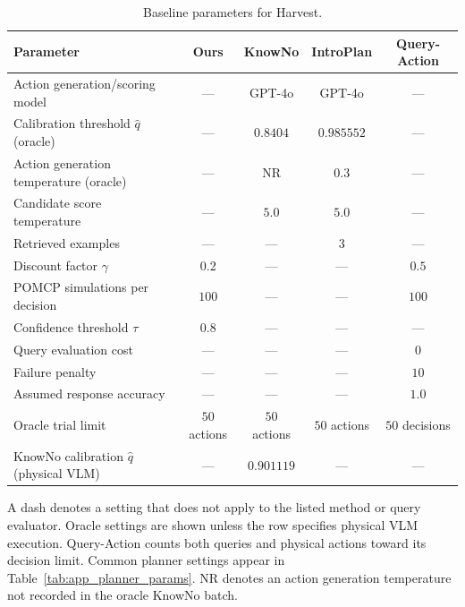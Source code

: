 \begin{table}[!htbp]
\centering
\caption{Baseline parameters for Harvest.}
\label{tab:app_baseline_params_tomato}
\small
\setlength{\tabcolsep}{5pt}
\renewcommand{\arraystretch}{1.12}
\begin{tabular*}{\textwidth}{@{\extracolsep{\fill}}lcccc@{}}
\toprule
Parameter & \textbf{Ours} & KnowNo & IntroPlan & Query-Action \\
\midrule
Action generation/scoring model & --- & GPT-4o & GPT-4o & --- \\
Calibration threshold $\hat{q}$ (oracle) & --- & $0.8404$ & $0.985552$ & --- \\
Action generation temperature (oracle) & --- & NR & $0.3$ & --- \\
Candidate score temperature & --- & $5.0$ & $5.0$ & --- \\
Retrieved examples & --- & --- & $3$ & --- \\
Discount factor $\gamma$ & $0.2$ & --- & --- & $0.5$ \\
POMCP simulations per decision & $100$ & --- & --- & $100$ \\
Confidence threshold $\tau$ & $0.8$ & --- & --- & --- \\
Query evaluation cost & --- & --- & --- & $0$ \\
Failure penalty & --- & --- & --- & $10$ \\
Assumed response accuracy & --- & --- & --- & $1.0$ \\
Oracle trial limit & $50$ actions & $50$ actions & $50$ actions & $50$ decisions \\
KnowNo calibration $\hat{q}$ (physical VLM) & --- & $0.901119$ & --- & --- \\
\bottomrule
\end{tabular*}
\par\smallskip
\begin{minipage}{\textwidth}
\footnotesize A dash denotes a setting that does not apply to the listed method or query evaluator. Oracle settings are shown unless the row specifies physical VLM execution. Query-Action counts both queries and physical actions toward its decision limit. Common planner settings appear in Table~\ref{tab:app_planner_params}. NR denotes an action generation temperature not recorded in the oracle KnowNo batch.
\end{minipage}
\end{table}

